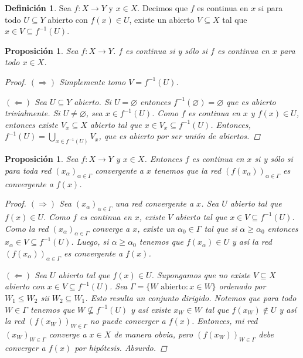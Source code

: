 \documentclass[12pt]{book}
\newtheorem{prop}[teo]{Proposición}
\theoremstyle{definition}
\newtheorem{defn}[teo]{Definición}
\let\emptyset\varnothing
\begin{document}
\begin{defn}
Sea $f:X\to Y$ y $x\in X$. Decimos que $f$ es continua en $x$ si para todo $U\subseteq Y$ abierto con $f(x)\in U$, existe un abierto $V\subseteq X$ tal que $x\in V\subseteq f^{-1}(U)$.
\end{defn}

\begin{prop}
Sea $f:X\to Y$. $f$ es continua si y sólo si $f$ es continua en $x$ para todo $x\in X$.
\begin{proof}
$(\Longrightarrow)$ Simplemente tomo $V = f^{-1}(U)$.

$(\Longleftarrow)$ Sea $U\subseteq Y$ abierto. Si $U=\emptyset$ entonces $f^{-1}(\emptyset)=\emptyset$ que es abierto trivialmente. Si $U\neq\emptyset$, sea $x\in f^{-1}(U)$. Como $f$ es continua en $x$ y $f(x)\in U$, entonces existe $V_x\subseteq X$ abierto tal que $x\in V_x\subseteq f^{-1}(U)$. Entonces, $f^{-1}(U) = \displaystyle\bigcup_{x\in f^{-1}(U)} V_x$, que es abierto por ser unión de abiertos.
\end{proof}
\end{prop}

\begin{prop}
Sea $f:X\to Y$ y $x\in X$. Entonces $f$ es continua en $x$ si y sólo si para toda red $(x_\alpha)_{\alpha\in\Gamma}$ convergente a $x$ tenemos que la red $(f(x_\alpha))_{\alpha\in\Gamma}$ es convergente a $f(x)$.
\begin{proof}
$(\Longrightarrow)$ Sea $(x_\alpha)_{\alpha\in\Gamma}$ una red convergente a $x$. Sea $U$ abierto tal que $f(x)\in U$. Como $f$ es continua en $x$, existe $V$ abierto tal que $x\in V\subseteq f^{-1}(U)$. Como la red $(x_\alpha)_{\alpha\in\Gamma}$ converge a $x$, existe un $\alpha_0\in\Gamma$ tal que si $\alpha\geq\alpha_0$ entonces $x_\alpha\in V\subseteq f^{-1}(U)$. Luego, si $\alpha\geq\alpha_0$ tenemos que $f(x_\alpha)\in U$ y así la red $(f(x_\alpha))_{\alpha\in\Gamma}$ es convergente a $f(x)$.

$(\Longleftarrow)$ Sea $U$ abierto tal que $f(x)\in U$. Supongamos que no existe $V\subseteq X$ abierto con $x\in V\subseteq f^{-1}(U)$. Sea $\Gamma = \{W \text{ abierto} : x\in W\}$ ordenado por $W_1\leq W_2$ sii $W_2\subseteq W_1$. Esto resulta un conjunto dirigido. Notemos que para todo $W\in\Gamma$ tenemos que $W\not\subseteq f^{-1}(U)$ y así existe $x_W\in W$ tal que $f(x_W)\notin U$ y así la red $(f(x_W))_{W\in\Gamma}$ no puede converger a $f(x)$. Entonces, mi red $(x_W)_{W\in\Gamma}$ converge a $x\in X$ de manera obvia, pero $(f(x_W))_{W\in\Gamma}$ debe converger a $f(x)$ por hipótesis. Absurdo.
\end{proof}
\end{prop}
\end{document}
